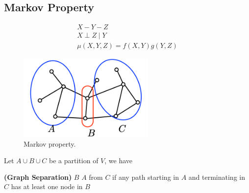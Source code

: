 \documentclass{article}
\newcommand{\bfs}[1]{\textbf{({#1}) }}
\begin{document}
\subsection{Markov Property}
\begin{exma}$$
\begin{gathered}
X-Y-Z \\
X \perp Z \mid Y \\
\mu(X, Y, Z)=f(X, Y) g(Y, Z)
\end{gathered}$$
\end{exma}
\begin{figure}[H]
    \centering
    \includegraphics[width=0.6\textwidth]{Figs/6.png}
    \caption{Markov property.}
    \label{fig:Markov}
\end{figure}
Let $A \cup B \cup C$ be a partition of $V$, we have
\begin{defa}\bfs{Graph Separation}
 $B$  $A$ from $C$ if any path starting in $A$ and terminating in $C$ has at least one node in $B$
\end{defa}
\end{document}
